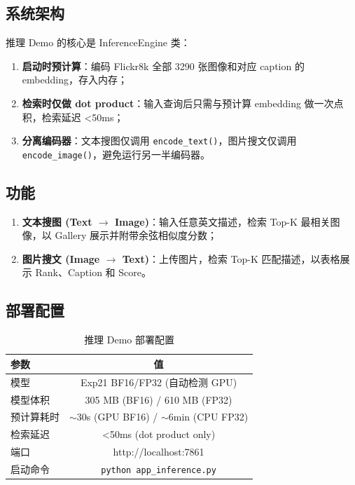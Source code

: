 \documentclass[12pt,a4paper]{article}
\begin{document}
\subsection{系统架构}

推理 Demo 的核心是 InferenceEngine 类：

\begin{enumerate}[nosep]
    \item \textbf{启动时预计算}：编码 Flickr8k 全部 3290 张图像和对应 caption 的 embedding，存入内存；
    \item \textbf{检索时仅做 dot product}：输入查询后只需与预计算 embedding 做一次点积，检索延迟 <50ms；
    \item \textbf{分离编码器}：文本搜图仅调用 \texttt{encode\_text()}，图片搜文仅调用 \texttt{encode\_image()}，避免运行另一半编码器。
\end{enumerate}

\subsection{功能}

\begin{enumerate}
    \item \textbf{文本搜图 (Text $\rightarrow$ Image)}：输入任意英文描述，检索 Top-K 最相关图像，以 Gallery 展示并附带余弦相似度分数；
    \item \textbf{图片搜文 (Image $\rightarrow$ Text)}：上传图片，检索 Top-K 匹配描述，以表格展示 Rank、Caption 和 Score。
\end{enumerate}

\subsection{部署配置}

\begin{table}[H]
\centering
\caption{推理 Demo 部署配置}
\begin{tabular}{lc}
\toprule
\textbf{参数} & \textbf{值} \\
\midrule
模型 & Exp21 BF16/FP32 (自动检测 GPU) \\
模型体积 & 305 MB (BF16) / 610 MB (FP32) \\
预计算耗时 & $\sim$30s (GPU BF16) / $\sim$6min (CPU FP32) \\
检索延迟 & <50ms (dot product only) \\
端口 & http://localhost:7861 \\
启动命令 & \texttt{python app\_inference.py} \\
\bottomrule
\end{tabular}
\end{table}
\end{document}
